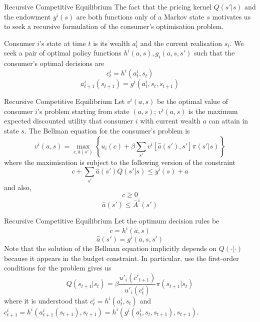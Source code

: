\documentclass[aspectratio=169,xcolor=dvipsnames]{beamer}
\begin{document}
\begin{frame}{Recursive Competitive Equilibrium}
    The fact that the pricing kernel $Q(s' | s)$ and the endowment $y^i(s)$ are both functions only of a Markov state $s$ motivates us to seek a recursive formulation of the consumer's optimisation problem.

    Consumer $i$'s state at time $t$ is its wealth $a^i_t$ and the current realisation $s_t$. We seek a pair of optimal policy functions $h^i(a, s), g_i(a, s, s')$ such that the consumer's optimal decisions are
    \[
        c^i_t = h^i(a^i_t, s_t)
    \]
    \[
        a^i_{t+1}(s_{t+1}) = g^i(a^i_t, s_t, s_{t+1})
    \]
\end{frame}

\begin{frame}{Recursive Competitive Equilibrium}
    Let $v^i(a, s)$ be the optimal value of consumer $i$'s problem starting from state $(a, s)$; $v^i(a, s)$ is the maximum expected discounted utility that consumer $i$ with current wealth $a$ can attain in state $s$. The Bellman equation for the consumer's problem is
    \[
        v^i(a, s) = \max_{c, \hat a(s')} \left\{ u_i(c) + \beta \sum_{s'} v^i[\hat a(s'), s'] \pi(s' | s)\right\}
    \]
    where the maximisation is subject to the following version of the constraint
    \[
        c + \sum_{s'} \hat a(s') Q(s' | s) \le y^i(s) + a
    \]
    and also,
    \[
        c \ge 0
    \]
    \[
        \hat a(s') \le \bar A^i(s')
    \]
\end{frame}

\begin{frame}{Recursive Competitive Equilibrium}
    Let the optimum decision rules be
    \[
        c = h^i(a, s)
    \]
    \[
        \hat a(s') = g^i(a, s, s')
    \]
    Note that the solution of the Bellman equation implicitly depends on $Q(\cdot | \cdot)$ because it appears in the budget constraint. In particular, use the first-order conditions for the problem gives us
    \[
        Q(s_{t+1} | s_t) = \beta \frac{u'_i(c'_{t+1})}{u'_i(c^i_t)} \pi(s_{t+1} | s_t)
    \]
    where it is understood that $c^i_t = h^i(a^i_t, s_t)$ and $c^i_{t+1} = h^i(a^i_{t+1}(s_{t+1}), s_{t+1}) = h^i(g^i(a^i_t, s_t, s_{t+1}), s_{t+1})$.
\end{frame}
\end{document}
